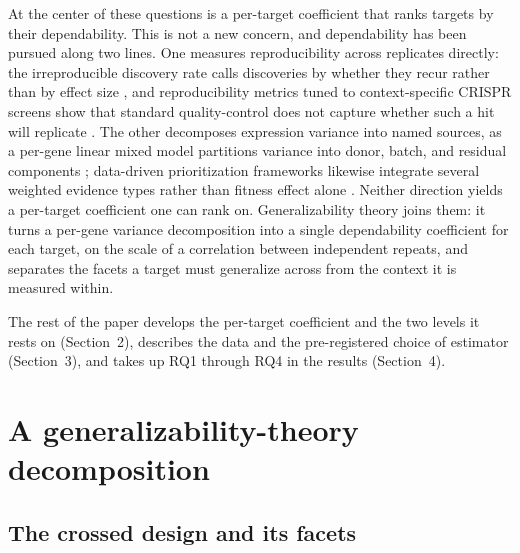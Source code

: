 \documentclass[11pt]{article}
\begin{document}
At the center of these questions is a per-target coefficient that ranks targets by
their dependability. This is not a new concern, and dependability has been pursued along two lines. One
measures reproducibility across replicates directly: the irreproducible discovery
rate calls discoveries by whether they recur rather than by effect size
\parencite{li2011idr}, and reproducibility metrics tuned to context-specific
CRISPR screens show that standard quality-control does not capture whether such a
hit will replicate \parencite{billmann2023}. The other decomposes expression
variance into named sources, as a per-gene linear mixed model partitions variance
into donor, batch, and residual components \parencite{hoffman2016}; data-driven
prioritization frameworks likewise integrate several weighted evidence types
rather than fitness effect alone \parencite{behan2019}. Neither direction yields a
per-target coefficient one can rank on. Generalizability theory joins them: it
turns a per-gene variance decomposition into a single dependability coefficient
for each target, on the scale of a correlation between independent repeats, and
separates the facets a target must generalize across from the context it is
measured within.

The rest of the paper develops the per-target coefficient and the two levels it
rests on (Section~2), describes the data and the pre-registered choice of
estimator (Section~3), and takes up RQ1 through RQ4 in the results (Section~4).

\section{A generalizability-theory decomposition}

\subsection{The crossed design and its facets}
\end{document}
